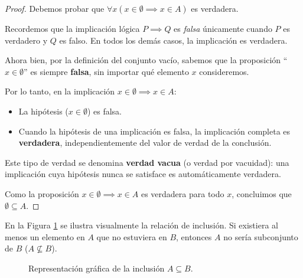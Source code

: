 \begin{proof}
Debemos probar que $\forall x (x \in \emptyset \implies x \in A)$ es verdadera.

Recordemos que la implicación lógica $P \implies Q$ es \textit{falsa} únicamente cuando $P$ es verdadero y $Q$ es falso. En todos los demás casos, la implicación es verdadera.

Ahora bien, por la definición del conjunto vacío, sabemos que la proposición ``$x \in \emptyset$'' es siempre \textbf{falsa}, sin importar qué elemento $x$ consideremos.

Por lo tanto, en la implicación $x \in \emptyset \implies x \in A$:
\begin{itemize}
    \item La hipótesis ($x \in \emptyset$) es falsa.
    \item Cuando la hipótesis de una implicación es falsa, la implicación completa es \textbf{verdadera}, independientemente del valor de verdad de la conclusión.
\end{itemize}

Este tipo de verdad se denomina \textbf{verdad vacua} (o verdad por vacuidad): una implicación cuya hipótesis nunca se satisface es automáticamente verdadera.

Como la proposición $x \in \emptyset \implies x \in A$ es verdadera para todo $x$, concluimos que $\emptyset \subseteq A$.
\end{proof}

En la Figura \ref{fig:subconjunto} se ilustra visualmente la relación de inclusión. Si existiera al menos un elemento en $A$ que no estuviera en $B$, entonces $A$ no sería subconjunto de $B$ ($A \not\subseteq B$).

\begin{figure}[ht]
\centering
{}
\caption{Representación gráfica de la inclusión $A \subseteq B$.}\label{fig:subconjunto}
\end{figure}

